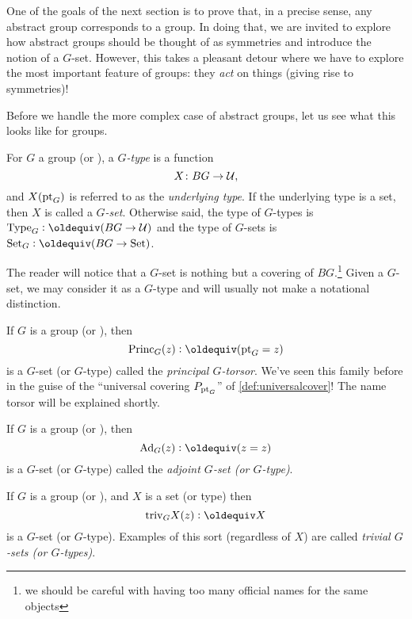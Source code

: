 One of the goals of the next section is to prove that, in a precise sense, any abstract group corresponds to a group.  In doing that, we are invited to explore how abstract groups should be thought of as symmetries and introduce the notion of a $G$-set.  However, this takes a pleasant detour where we have to explore the most important feature of groups: they \emph{act} on things (giving rise to symmetries)!

Before we handle the more complex case of abstract groups, let us see what this looks like for groups.

\begin{definition}
  For $G$ a group (or \inftygp), a \emph{$G$-type} is a function
  $$X\colon BG\to\mathcal{U},$$
and $X({\mathord{\mathrm{pt}}}_G)$ is referred to as the \emph{underlying type}.
If the underlying type is a set, then $X$ is called a \emph{$G$-set}.
Otherwise said, the type of $G$-types is $\Type_G\defequi(BG\to\UU)$ and the type of $G$-sets is $\Set_G\defequi(BG\to\Set)$.
\end{definition}

The reader will notice that a $G$-set is nothing but a covering of $BG$.\footnote{we should be careful with having too many official names for the same objects}
Given a $G$-set, we may consider it as a $G$-type and will usually not make a notational distinction.

\begin{example}\label{def:principaltorsor}
  If $G$ is a group (or \inftygp), then
$$\princ_G(z)\defequi(\pt_G=z)$$ is a $G$-set (or $G$-type) called the \emph{principal $G$-torsor}.  We've seen this family before in the guise of the ``universal covering $P_{{\mathord{\mathrm{pt}}}_G}$'' of \cref{def:universalcover}!
The name torsor will be explained shortly.
\end{example}

\newcommand{\Ad}{\mathrm{Ad}}
\begin{example}\label{def:adjointrep}
  If $G$ is a group (or \inftygp), then
$$\Ad_G(z)\defequi(z=z)$$ is a $G$-set (or $G$-type) called the \emph{adjoint $G$-set (or $G$-type)}.
\end{example}
\begin{example}\label{def:trivGset}
  If $G$ is a group (or \inftygp), and $X$ is a set (or type) then
$$\mathrm{triv}_GX(z)\defequi X$$ is a $G$-set (or $G$-type).  Examples of this sort (regardless of $X$) are called \emph{trivial $G$-sets (or $G$-types)}.
\end{example}

